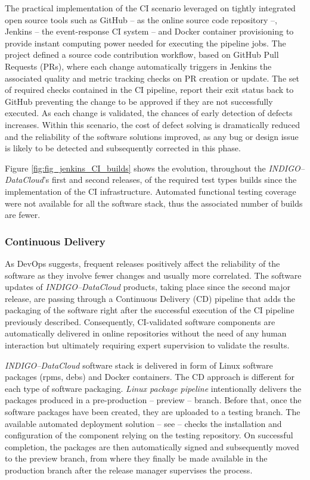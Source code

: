 \documentclass[journal]{IEEEtran}
\begin{document}
The practical implementation of the CI scenario leveraged on tightly integrated open
source tools such as GitHub \cite{github} -- as the online source code repository --,
Jenkins \cite{jenkins} -- the event-response CI system -- and Docker container
provisioning to provide instant computing power needed for executing the pipeline jobs.
The project defined a source code contribution workflow, based on GitHub Pull Requests
(PRs), where each change automatically triggers in Jenkins the associated quality and
metric tracking checks on PR creation or update. The set of required checks contained
in the CI pipeline, report their exit status back to GitHub preventing the change to be
approved if they are not successfully executed. As each change is validated, the chances
of early detection of defects increases. Within this scenario, the cost of defect solving
is dramatically reduced and the reliability of the software solutions improved, as any
bug or design issue is likely to be detected and subsequently corrected in this phase.

Figure \ref{fig:fig_jenkins_CI_builds} shows the evolution, throughout the
{\sl INDIGO--DataCloud}'s first and second releases, of the required test types builds since the
implementation of the CI infrastructure. Automated functional testing coverage were not
available for all the software stack, thus the associated number of builds are fewer.

\subsubsection{Continuous Delivery}
As DevOps suggests, frequent releases positively affect the reliability of the software as
they involve fewer changes and usually more correlated. The software updates of
{\sl INDIGO--DataCloud} products, taking place since the second major release, are passing through
a Continuous Delivery (CD) pipeline that adds the packaging of the software right after the
successful execution of the CI pipeline previously described. Consequently, CI-validated
software components are automatically delivered in online repositories without the need of
any human interaction but ultimately requiring expert supervision to validate the results.

{\sl INDIGO--DataCloud} software stack is delivered in form of Linux software packages (rpms, debs)
and Docker containers. The CD approach is different for each type of software packaging. \textit{Linux
package pipeline} intentionally delivers the packages produced in a pre-production -- preview --
branch. Before that, once the software packages have been created, they are uploaded to a
testing branch. The available automated deployment solution -- see \cite{subsec:sqa} -- checks
the installation and configuration of the component relying on the testing repository. On
successful completion, the packages are then automatically signed and subsequently moved to
the preview branch, from where they finally be made available in the production branch after
the release manager supervises the process.
\end{document}
